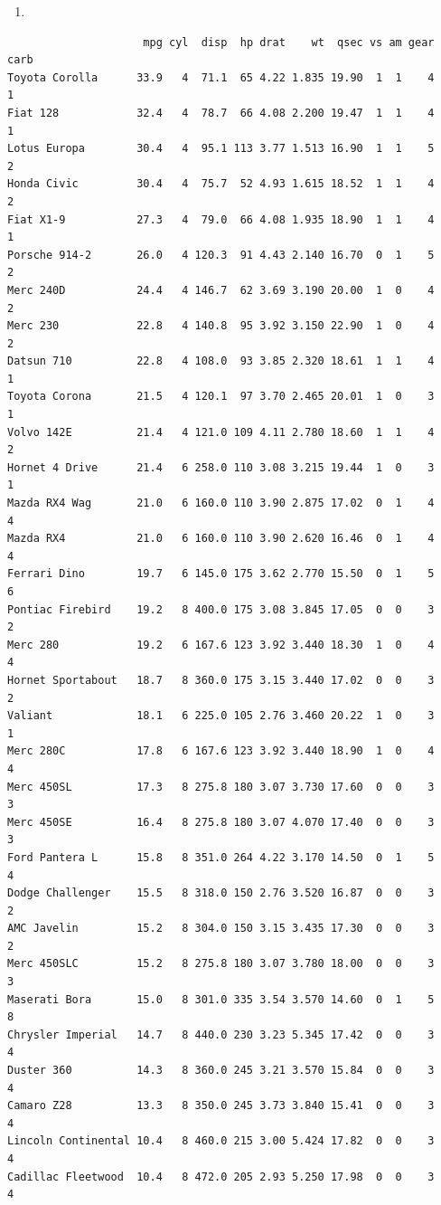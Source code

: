 \documentclass[
  letterpaper,
  DIV=11,
  numbers=noendperiod]{scrreprt}
\newenvironment{Shaded}{\begin{snugshade}}{\end{snugshade}}
\newcommand{\CommentTok}[1]{\textcolor[rgb]{0.37,0.37,0.37}{#1}}
\newcommand{\FunctionTok}[1]{\textcolor[rgb]{0.28,0.35,0.67}{#1}}
\newcommand{\NormalTok}[1]{\textcolor[rgb]{0.00,0.23,0.31}{#1}}
\newcommand{\SpecialCharTok}[1]{\textcolor[rgb]{0.37,0.37,0.37}{#1}}
\providecommand{\tightlist}{%
  \setlength{\itemsep}{0pt}\setlength{\parskip}{0pt}}\usepackage{longtable,booktabs,array}
\begin{document}
\begin{enumerate}
\def\labelenumi{\alph{enumi})}
\setcounter{enumi}{7}
\tightlist
\item
\end{enumerate}

\begin{Shaded}
\end{Shaded}

\begin{verbatim}
                     mpg cyl  disp  hp drat    wt  qsec vs am gear carb
Toyota Corolla      33.9   4  71.1  65 4.22 1.835 19.90  1  1    4    1
Fiat 128            32.4   4  78.7  66 4.08 2.200 19.47  1  1    4    1
Lotus Europa        30.4   4  95.1 113 3.77 1.513 16.90  1  1    5    2
Honda Civic         30.4   4  75.7  52 4.93 1.615 18.52  1  1    4    2
Fiat X1-9           27.3   4  79.0  66 4.08 1.935 18.90  1  1    4    1
Porsche 914-2       26.0   4 120.3  91 4.43 2.140 16.70  0  1    5    2
Merc 240D           24.4   4 146.7  62 3.69 3.190 20.00  1  0    4    2
Merc 230            22.8   4 140.8  95 3.92 3.150 22.90  1  0    4    2
Datsun 710          22.8   4 108.0  93 3.85 2.320 18.61  1  1    4    1
Toyota Corona       21.5   4 120.1  97 3.70 2.465 20.01  1  0    3    1
Volvo 142E          21.4   4 121.0 109 4.11 2.780 18.60  1  1    4    2
Hornet 4 Drive      21.4   6 258.0 110 3.08 3.215 19.44  1  0    3    1
Mazda RX4 Wag       21.0   6 160.0 110 3.90 2.875 17.02  0  1    4    4
Mazda RX4           21.0   6 160.0 110 3.90 2.620 16.46  0  1    4    4
Ferrari Dino        19.7   6 145.0 175 3.62 2.770 15.50  0  1    5    6
Pontiac Firebird    19.2   8 400.0 175 3.08 3.845 17.05  0  0    3    2
Merc 280            19.2   6 167.6 123 3.92 3.440 18.30  1  0    4    4
Hornet Sportabout   18.7   8 360.0 175 3.15 3.440 17.02  0  0    3    2
Valiant             18.1   6 225.0 105 2.76 3.460 20.22  1  0    3    1
Merc 280C           17.8   6 167.6 123 3.92 3.440 18.90  1  0    4    4
Merc 450SL          17.3   8 275.8 180 3.07 3.730 17.60  0  0    3    3
Merc 450SE          16.4   8 275.8 180 3.07 4.070 17.40  0  0    3    3
Ford Pantera L      15.8   8 351.0 264 4.22 3.170 14.50  0  1    5    4
Dodge Challenger    15.5   8 318.0 150 2.76 3.520 16.87  0  0    3    2
AMC Javelin         15.2   8 304.0 150 3.15 3.435 17.30  0  0    3    2
Merc 450SLC         15.2   8 275.8 180 3.07 3.780 18.00  0  0    3    3
Maserati Bora       15.0   8 301.0 335 3.54 3.570 14.60  0  1    5    8
Chrysler Imperial   14.7   8 440.0 230 3.23 5.345 17.42  0  0    3    4
Duster 360          14.3   8 360.0 245 3.21 3.570 15.84  0  0    3    4
Camaro Z28          13.3   8 350.0 245 3.73 3.840 15.41  0  0    3    4
Lincoln Continental 10.4   8 460.0 215 3.00 5.424 17.82  0  0    3    4
Cadillac Fleetwood  10.4   8 472.0 205 2.93 5.250 17.98  0  0    3    4
\end{verbatim}
\end{document}
